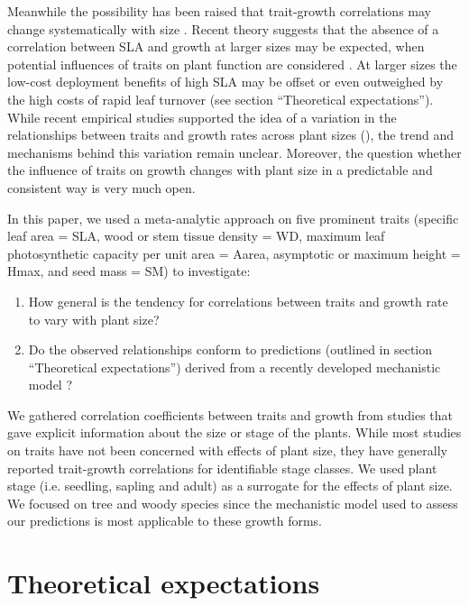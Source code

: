 \documentclass[a4paper,11pt]{article}
\begin{document}
Meanwhile the possibility has been raised that trait-growth correlations may change systematically with size \citep{Falster:2011ii, Ruger:2012jv, Iida:2014ep, Iida:2014hq}. Recent theory suggests that the absence of a correlation between SLA and growth at larger sizes may be expected, when potential influences of traits on plant function are considered \citep{Falster:2011ii}. At larger sizes the low-cost deployment benefits of high SLA may be offset or even outweighed by the high costs of rapid leaf turnover (see section ``Theoretical expectations''). While recent empirical studies supported the idea of a variation in the relationships between traits and growth rates across plant sizes (\citealt{Iida:2014ep, Iida:2014hq}), the trend and mechanisms behind this variation remain unclear. Moreover, the question whether the influence of traits on growth changes with plant size in a predictable and consistent way is very much open.

In this paper, we used a meta-analytic approach on five prominent traits (specific leaf area = SLA, wood or stem tissue density = WD, maximum leaf photosynthetic capacity per unit area = Aarea, asymptotic or maximum height = Hmax, and seed mass = SM) to investigate:
\begin{enumerate}
  \item How general is the tendency for correlations between traits and growth rate to vary with plant size?
  \item  Do the observed relationships conform to predictions (outlined in section ``Theoretical expectations'') derived from a recently developed mechanistic model \citep{Falster:2011ii}?
\end{enumerate}
We gathered correlation coefficients between traits and growth from studies that gave explicit information about the size or stage of the plants. While most studies on traits have not been concerned with effects of plant size, they have generally reported trait-growth correlations for identifiable stage classes. We used plant stage (i.e. seedling, sapling and adult) as a surrogate for the effects of plant size. We focused on tree and woody species since the mechanistic model used to assess our predictions is most applicable to these growth forms.

\section*{Theoretical expectations}\label{theory}
\end{document}
